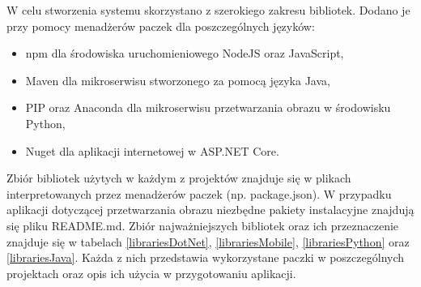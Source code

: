 W celu stworzenia systemu skorzystano z szerokiego zakresu bibliotek. Dodano je przy pomocy menadżerów paczek dla poszczególnych języków:
\begin{itemize}[noitemsep]
	\item npm dla środowiska uruchomieniowego NodeJS oraz JavaScript,
	\item Maven dla mikroserwisu stworzonego za pomocą języka Java,
	\item PIP oraz Anaconda dla mikroserwisu przetwarzania obrazu w środowisku Python,
	\item Nuget dla aplikacji internetowej w ASP.NET Core.
\end{itemize}

Zbiór bibliotek użytych w każdym z projektów znajduje się w plikach interpretowanych przez menadżerów paczek (np. package.json). W przypadku aplikacji dotyczącej przetwarzania obrazu niezbędne pakiety instalacyjne znajdują się pliku README.md. Zbiór najważniejszych bibliotek oraz ich przeznaczenie znajduje się w tabelach \ref{librariesDotNet}, \ref{librariesMobile}, \ref{librariesPython} oraz \ref{librariesJava}. Każda z nich przedstawia wykorzystane paczki w poszczególnych projektach oraz opis ich użycia w przygotowaniu aplikacji.

